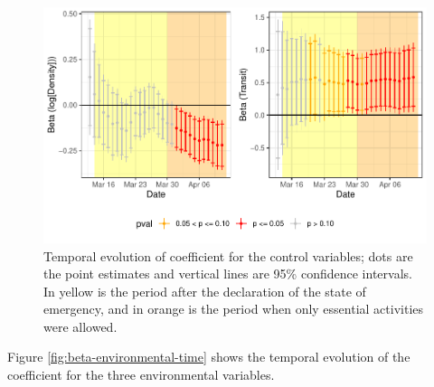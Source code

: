 \documentclass[]{elsarticle} %
\makeatletter
\def\maxwidth{\ifdim\Gin@nat@width>\linewidth\linewidth
\else\Gin@nat@width\fi}
\let\Oldincludegraphics\includegraphics
\renewcommand{\includegraphics}[1]{\Oldincludegraphics[width=\maxwidth]{#1}}
\makeatother
\begin{document}
\begin{figure}
\centering
\includegraphics{Environmental-Correlates-of-COVID19-Spain_files/figure-latex/beta-controls-time-1.pdf}
\caption{\label{fig:beta-controls-time}Temporal evolution of coefficient
for the control variables; dots are the point estimates and vertical
lines are 95\% confidence intervals. In yellow is the period after the
declaration of the state of emergency, and in orange is the period when
only essential activities were allowed.}
\end{figure}

Figure \ref{fig:beta-environmental-time} shows the temporal evolution of
the coefficient for the three environmental variables.
\end{document}
